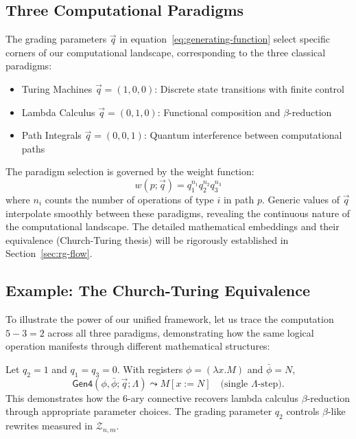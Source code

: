 \subsection{Three Computational Paradigms}

The grading parameters $\vec{q}$ in equation~\eqref{eq:generating-function} select specific corners of our computational landscape, corresponding to the three classical paradigms:
\begin{itemize}
\item Turing Machines $\vec{q} = (1,0,0)$: Discrete state transitions with finite control
\item Lambda Calculus $\vec{q} = (0,1,0)$: Functional composition and $\beta$-reduction  
\item Path Integrals $\vec{q} = (0,0,1)$: Quantum interference between computational paths
\end{itemize}

The paradigm selection is governed by the weight function:
\[
w(p;\vec{q}) = q_1^{n_1} q_2^{n_2} q_3^{n_3}
\]
where $n_i$ counts the number of operations of type $i$ in path $p$. Generic values of $\vec{q}$ interpolate smoothly between these paradigms, revealing the continuous nature of the computational landscape. The detailed mathematical embeddings and their equivalence (Church-Turing thesis) will be rigorously established in Section~\ref{sec:rg-flow}.

\subsection{Example: The Church-Turing Equivalence}

To illustrate the power of our unified framework, let us trace the computation $5-3=2$ across all three paradigms, demonstrating how the same logical operation manifests through different mathematical structures:

\begin{example}
\label{ex:concrete-reduction}
Let $q_2=1$ and $q_1=q_3=0$. With registers $\phi=(\lambda x.M)$ and $\bar{\phi}=N$,
\[
\mathsf{Gen4}(\phi,\bar{\phi};\vec{q};\Lambda) \leadsto M[x:=N] \quad \text{(single $\Lambda$-step)}.
\]
This demonstrates how the 6-ary connective recovers lambda calculus $\beta$-reduction through appropriate parameter choices. The grading parameter $q_2$ controls $\beta$-like rewrites measured in $\mathcal{Z}_{n,m}$.
\end{example}

